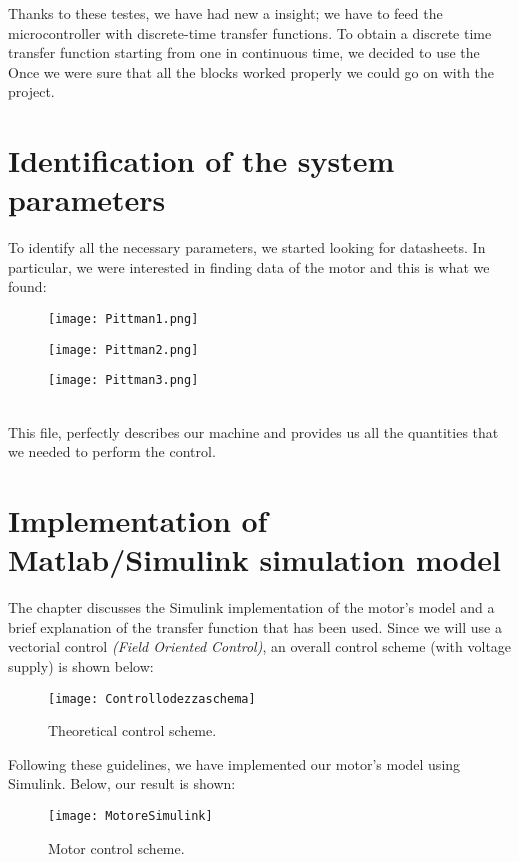 \documentclass[12pt]{article}
\begin{document}
Thanks to these testes, we have had new a insight; we have to feed the microcontroller with discrete-time transfer functions.
To obtain a discrete time transfer function starting from one in continuous time, we decided to use the   
Once we were sure that all the blocks worked properly we could go on with the project.

\newpage\section{Identification of the system parameters}

To identify all the necessary parameters, we started looking for datasheets.
In particular, we were interested in finding data of the motor and this is what we found: 
\begin{figure}[h]
\centering
\texttt{[image: Pittman1.png]}
\end{figure}
\begin{figure}[h]
\centering
\texttt{[image: Pittman2.png]}
\end{figure}
\begin{figure}[h]
\centering
\texttt{[image: Pittman3.png]}
\end{figure}\\[0.7cm]
This file, perfectly describes our machine and provides us all the quantities that we needed to perform the control.

\section{Implementation of Matlab/Simulink simulation model}
The chapter discusses the Simulink implementation of the motor's model and a brief explanation of the transfer function that has been used.
Since we will use a vectorial control \textit{(Field Oriented Control)}, an overall control scheme (with voltage supply) is shown below:
\begin{figure}[h]
\centering
\texttt{[image: Controllodezzaschema]}
\caption{Theoretical control scheme.}
\end{figure}

Following these guidelines, we have implemented our motor's model using Simulink.
Below, our result is shown:
\begin{figure}[h]
\centering
\texttt{[image: MotoreSimulink]}
\caption{Motor control scheme.}
\end{figure}
\end{document}
